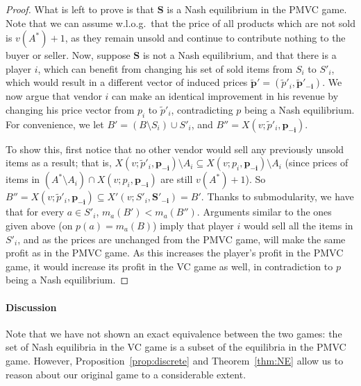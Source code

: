\begin{proof}
What is left to prove is that $\mathbf{S}$ is a Nash equilibrium in the PMVC game. Note that we can assume w.l.o.g.\ that the price of all products which are not sold is $v(A^*)+1$, as they remain unsold and continue to contribute nothing to the buyer or seller. Now, suppose $\mathbf{S}$ is not a Nash equilibrium, and that there is a player $i$, which can benefit from changing his set of sold items from $S_i$ to $S'_i$, which would result in a different vector of induced prices $\mathbf{\tilde p'}=(\tilde p'_i, \mathbf{\tilde p'_{-i}})$. We now argue that vendor $i$ can make an identical improvement in his revenue by changing his price vector from $p_i$ to $\tilde p'_i$, contradicting $p$ being a Nash equilibrium. For convenience, we let $B'=(B \setminus S_i) \cup S'_i$, and $B'' = X(v;\tilde p'_i,\mathbf{p_{-i}})$.

To show this, first notice that no other vendor would sell any previously unsold items as a result; that is, $X(v;\tilde p'_i,\mathbf{p_{-i}}) \setminus A_i \subseteq X(v;p_i,\mathbf{p_{-i}}) \setminus A_i$ (since prices of items in $(A^*\setminus A_{i})\cap  X(v;p_i,\mathbf{p_{-i}})$ are still $v(A^*)+1$). So $B''=X(v;\tilde p'_i,\mathbf{p_{-i}}) \subseteq X'(v;S'_i,\mathbf{S'_{-i}})=B'$. Thanks to submodularity, we have that for every $a \in S'_i$, $m_{a}(B')<m_{a}(B'')$. Arguments similar to the ones given above (on $p(a)=m_{a}(B)$) imply that player $i$ would sell all the items in $S'_i$, and as the prices are unchanged from the PMVC game, will make the same profit as in the PMVC game. As this increases the player's profit in the PMVC game, it would increase its profit in the VC game as well, in contradiction to $p$ being a Nash equilibrium. 
\end{proof}

\paragraph{Discussion}
Note that we have not shown an exact equivalence between the two games: the set of Nash equilibria in the VC game is a subset of the equilibria in the PMVC game.
However, Proposition~\ref{prop:discrete} and Theorem~\ref{thm:NE} allow us to reason about our original game to a considerable extent. 


